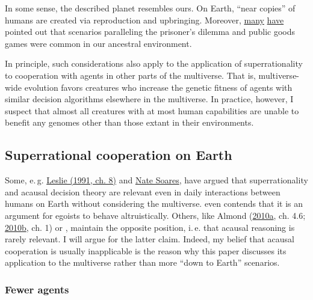 In some sense, the described planet resembles ours. On Earth, ``near
copies'' of humans are created via reproduction and upbringing.
Moreover,
\href{http://mindingourway.com/newcomblike-problems-are-the-norm/}{many}
\href{https://en.wikipedia.org/wiki/Prisoner\%27s_dilemma\#Real-life_examples}{have}
pointed out that scenarios paralleling the prisoner's dilemma and public
goods games were common in our ancestral environment.

In principle, such considerations also apply to the
application of superrationality to cooperation with agents in other parts of the multiverse.
That is, multiverse-wide evolution
favors creatures who increase the genetic fitness of agents with similar
decision algorithms elsewhere in the multiverse. In practice, however, I
suspect that almost all creatures with at most human capabilities are
unable to benefit any genomes other than those extant in their
environments.

\hypertarget{superrational-cooperation-on-earth}{\subsection{Superrational
cooperation on Earth}\label{superrational-cooperation-on-earth}}

Some, e.\,g.
\href{http://www.jstor.org/stable/2254984?seq=1\#page_scan_tab_contents}{Leslie
(1991, ch. 8)} and
\href{http://mindingourway.com/newcomblike-problems-are-the-norm/}{Nate Soares}, have argued that
superrationality and acausal decision theory
are relevant even in daily interactions between humans on Earth without
considering the multiverse. \citet[chapter 7]{Drescher2006-ky} even contends that it is an
argument for egoists to behave altruistically. Others, like Almond
(\href{https://casparoesterheld.files.wordpress.com/2016/12/almond_edt_1.pdf}{2010a},
ch. 4.6;
\href{https://web.archive.org/web/20120310010225/http://www.paul-almond.com/Correlation2.pdf}{2010b},
ch. 1) or \citet[chapter 4]{Ahmed2014-ec}, maintain the opposite
position, i.\,e. that acausal reasoning is rarely relevant. I will argue
for the latter claim. Indeed, my belief that acausal cooperation is
usually inapplicable is the reason why this paper discusses its
application to the multiverse rather than more ``down to Earth''
scenarios.

\subsubsection{Fewer agents}\label{fewer-agents}

